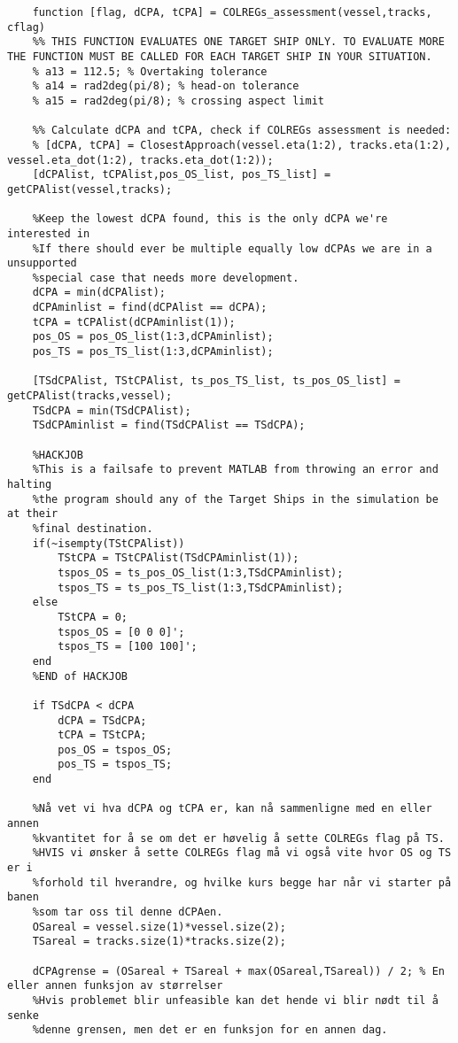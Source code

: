 \begin{lstlisting}
    function [flag, dCPA, tCPA] = COLREGs_assessment(vessel,tracks, cflag)
    %% THIS FUNCTION EVALUATES ONE TARGET SHIP ONLY. TO EVALUATE MORE THE FUNCTION MUST BE CALLED FOR EACH TARGET SHIP IN YOUR SITUATION.
    % a13 = 112.5; % Overtaking tolerance
    % a14 = rad2deg(pi/8); % head-on tolerance
    % a15 = rad2deg(pi/8); % crossing aspect limit
    
    %% Calculate dCPA and tCPA, check if COLREGs assessment is needed:
    % [dCPA, tCPA] = ClosestApproach(vessel.eta(1:2), tracks.eta(1:2), vessel.eta_dot(1:2), tracks.eta_dot(1:2));
    [dCPAlist, tCPAlist,pos_OS_list, pos_TS_list] = getCPAlist(vessel,tracks);
    
    %Keep the lowest dCPA found, this is the only dCPA we're interested in
    %If there should ever be multiple equally low dCPAs we are in a unsupported
    %special case that needs more development.
    dCPA = min(dCPAlist);
    dCPAminlist = find(dCPAlist == dCPA);
    tCPA = tCPAlist(dCPAminlist(1));
    pos_OS = pos_OS_list(1:3,dCPAminlist);
    pos_TS = pos_TS_list(1:3,dCPAminlist);
    
    [TSdCPAlist, TStCPAlist, ts_pos_TS_list, ts_pos_OS_list] = getCPAlist(tracks,vessel);
    TSdCPA = min(TSdCPAlist);
    TSdCPAminlist = find(TSdCPAlist == TSdCPA);
    
    %HACKJOB
    %This is a failsafe to prevent MATLAB from throwing an error and halting
    %the program should any of the Target Ships in the simulation be at their
    %final destination.
    if(~isempty(TStCPAlist))
        TStCPA = TStCPAlist(TSdCPAminlist(1));
        tspos_OS = ts_pos_OS_list(1:3,TSdCPAminlist);
        tspos_TS = ts_pos_TS_list(1:3,TSdCPAminlist);
    else
        TStCPA = 0;
        tspos_OS = [0 0 0]';
        tspos_TS = [100 100]';
    end
    %END of HACKJOB
    
    if TSdCPA < dCPA
        dCPA = TSdCPA;
        tCPA = TStCPA;
        pos_OS = tspos_OS;
        pos_TS = tspos_TS;
    end
    
    %Nå vet vi hva dCPA og tCPA er, kan nå sammenligne med en eller annen
    %kvantitet for å se om det er høvelig å sette COLREGs flag på TS.
    %HVIS vi ønsker å sette COLREGs flag må vi også vite hvor OS og TS er i
    %forhold til hverandre, og hvilke kurs begge har når vi starter på banen
    %som tar oss til denne dCPAen.
    OSareal = vessel.size(1)*vessel.size(2);
    TSareal = tracks.size(1)*tracks.size(2);
    
    dCPAgrense = (OSareal + TSareal + max(OSareal,TSareal)) / 2; % En eller annen funksjon av størrelser
    %Hvis problemet blir unfeasible kan det hende vi blir nødt til å senke
    %denne grensen, men det er en funksjon for en annen dag.
    

\end{lstlisting}
